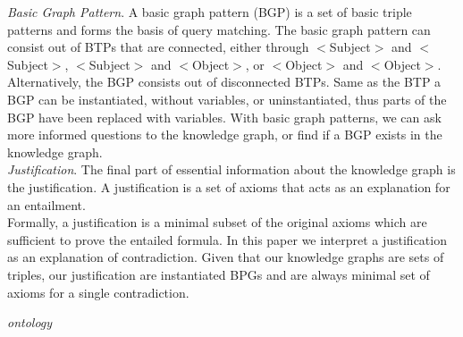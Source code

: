 \documentclass{article}
\begin{document}
\textit{Basic Graph Pattern}. A basic graph pattern (BGP) is a set of basic triple patterns and forms the basis of query matching. The basic graph pattern
can consist out of BTPs that are connected, either through $<$Subject$>$ and $<$Subject$>$, $<$Subject$>$ and $<$Object$>$, or $<$Object$>$ and $<$Object$>$.
Alternatively, the BGP consists out of disconnected BTPs. Same as the BTP a BGP can be instantiated, without variables, or uninstantiated, thus parts of the BGP have been replaced with variables. With basic graph patterns, we can ask more informed questions to the knowledge graph, or find if a BGP exists in the knowledge graph.\\

\textit{Justification}. The final part of essential information about the knowledge graph is the justification\cite{Horridge:2009}. A justification is a set of axioms that acts as an explanation for an entailment.\\

Formally, a justification is a minimal subset of the original axioms which are sufficient to prove the entailed formula. In this paper we interpret a justification as an explanation of contradiction. Given that our knowledge graphs are sets of triples, our justification are instantiated BPGs and are always minimal set of axioms for a single contradiction. 

\textit{ontology}
\end{document}
